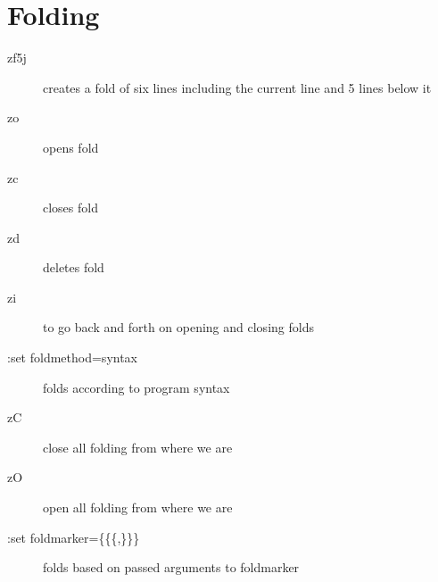 \documentclass[a4paper, 12pt]{article}
\begin{document}
\section{Folding}
\begin{description}
	\item[zf5j] creates a fold of six lines including the current line and 5 lines below it
	\item[zo] opens fold
	\item[zc] closes fold
	\item[zd] deletes fold
	\item[zi] to go back and forth on opening and closing folds
	\item[:set foldmethod=syntax] folds according to program syntax
	\item[zC] close all folding from where we are
	\item[zO] open all folding from where we are
	\item[:set foldmarker=\{\{\{,\}\}\}] folds based on passed arguments to foldmarker
\end{description}

\end{document}
